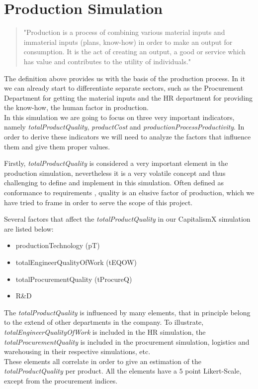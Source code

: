 \section{Production Simulation}
\label{sec:productionSim}
 \begin{quotation}
"Production is a process of combining various material inputs and immaterial inputs (plans, know-how) in order to make an output for consumption. It is the act of creating an output, a good or service which has value and contributes to the utility of individuals."\cite{noauthor_production_2019}
 \end{quotation}
The definition above provides us with the basis of the production process. In it we can already start to differentiate separate sectors, such as the Procurement Department for getting the material inputs and the HR department for providing the know-how, the human factor in production. \\
In this simulation we are going to focus on three very important indicators, namely \textit{totalProductQuality}, 
\textit{productCost} %
and \textit{productionProcessProductivity}. In order to derive these indicators we will need to analyze the factors that influence them and give them proper values. 

Firstly, \textit{totalProductQuality} is considered a very important element in the production simulation, nevertheless it is a very volatile concept and thus challenging to define and implement in this simulation. Often defined as conformance to requirements \cite{crosby_quality_1979}, quality is an elusive factor of production, which we have tried to frame in order to serve the scope of this project.

 Several factors that affect the \textit{totalProductQuality} in our CapitalismX simulation are listed below:
\begin{itemize}
\item productionTechnology (pT)
\item totalEngineerQualityOfWork (tEQOW) 
\item totalProcurementQuality (tProcureQ)
\item R\&D
\end{itemize}
The \textit{totalProductQuality} is influenced by many elements, that in principle belong to the extend of other departments in the company. To illustrate, \textit{totalEngineerQualityOfWork} is included in the HR simulation, the \textit{totalProcurementQuality} is included in the procurement simulation, logistics and warehousing in their respective simulations, etc. \\
These elements all correlate in order to give an estimation of the \textit{totalProductQuality} per product.
All the elements have a $5$ point Likert-Scale, except from the procurement indices. 

